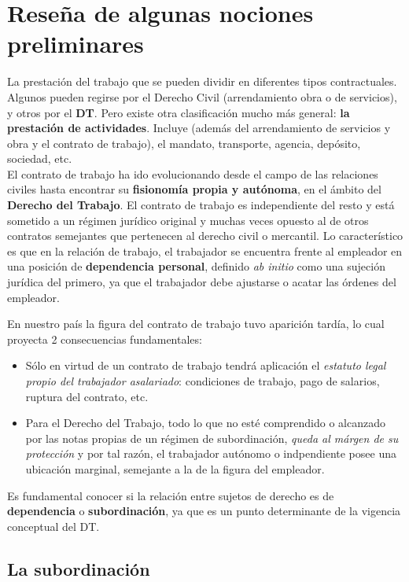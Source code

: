 \documentclass[spanish,12pt,a4paper,titlepage]{report}
\begin{document}
\section{Reseña de algunas nociones preliminares}

La prestación del trabajo que se pueden dividir en diferentes tipos contractuales. Algunos pueden regirse por el Derecho Civil (arrendamiento obra o de servicios), y otros por el \textbf{DT}. Pero existe otra clasificación mucho más general: \textbf{la prestación de actividades}. Incluye (además del arrendamiento de servicios y obra y el contrato de trabajo), el mandato, transporte, agencia, depósito, sociedad, etc.\\

El contrato de trabajo ha ido evolucionando desde el campo de las relaciones civiles hasta encontrar su \textbf{fisionomía propia y autónoma}, en el ámbito del \textbf{Derecho del Trabajo}. El contrato de trabajo es independiente del resto y está sometido a un régimen jurídico original y muchas veces opuesto al de otros contratos semejantes que pertenecen al derecho civil o mercantil.
Lo característico es que en la relación de trabajo, el trabajador se encuentra frente al empleador en una posición de \textbf{dependencia personal}, definido \textit{ab initio} como una sujeción jurídica del primero, ya que el trabajador debe ajustarse o acatar las órdenes del empleador.

En nuestro país la figura del contrato de trabajo tuvo aparición tardía, lo cual proyecta 2 consecuencias fundamentales:
\begin{itemize}
	\item Sólo en virtud de un contrato de trabajo tendrá aplicación el \emph{estatuto legal propio del trabajador asalariado}: condiciones de trabajo, pago de salarios, ruptura del contrato, etc.
	\item Para el Derecho del Trabajo, todo lo que no esté comprendido o alcanzado por las notas propias de un régimen de subordinación, \emph{queda al márgen de su protección} y por tal razón, el trabajador autónomo o indpendiente posee una ubicación marginal, semejante a la de la figura del empleador.
\end{itemize}

Es fundamental conocer si la relación entre sujetos de derecho es de \textbf{dependencia} o \textbf{subordinación}, ya que es un punto determinante de la vigencia conceptual del DT.

\subsection{La subordinación}
\end{document}
